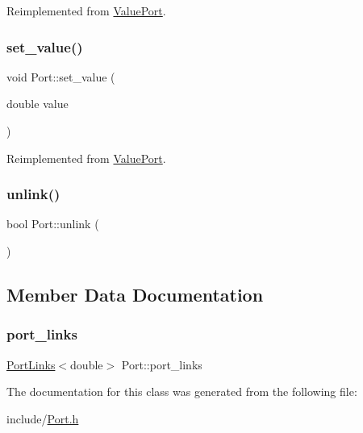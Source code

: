 Reimplemented from \hyperlink{class_value_port_a9eaeb8abfb060cc2dd2c2b087ecb3bb9}{Value\+Port}.

\mbox{\label{class_port_a28311c7a8fe9e2838aa8ae63a37d2d9a}} 
\subsubsection{\texorpdfstring{set\+\_\+value()}{set\_value()}\hspace{0.1cm}{\footnotesize\ttfamily [2/2]}}
{\footnotesize\ttfamily void Port\+::set\+\_\+value (\begin{DoxyParamCaption}\item[{double}]{value }\end{DoxyParamCaption})\hspace{0.3cm}{\ttfamily [virtual]}}



Reimplemented from \hyperlink{class_value_port_a0647059eb7965920af4e622625b5e67e}{Value\+Port}.

\mbox{\label{class_port_a9a9f8bbbde14187dfb55ef6fbc27492b}} 
\subsubsection{\texorpdfstring{unlink()}{unlink()}}
{\footnotesize\ttfamily bool Port\+::unlink (\begin{DoxyParamCaption}{ }\end{DoxyParamCaption})\hspace{0.3cm}{\ttfamily [inline]}}



\subsection{Member Data Documentation}
\mbox{\label{class_port_a7e6cb81c715e20f7432d6c78a9e3c269}} 
\subsubsection{\texorpdfstring{port\+\_\+links}{port\_links}}
{\footnotesize\ttfamily \hyperlink{class_port_links}{Port\+Links}$<$double$>$ Port\+::port\+\_\+links}



The documentation for this class was generated from the following file\+:\begin{DoxyCompactItemize}
\item 
include/\hyperlink{_port_8h}{Port.\+h}\end{DoxyCompactItemize}
